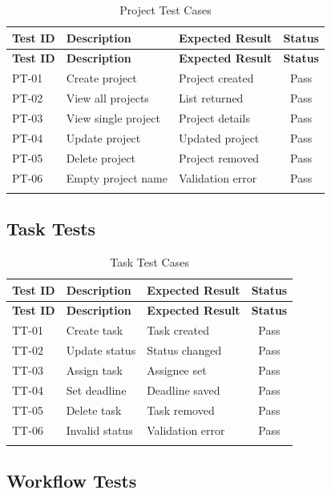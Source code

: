 \documentclass[12pt,a4paper,twoside]{book}
\begin{document}
\begin{longtable}{|l|p{4cm}|p{3cm}|c|}
\hline
\textbf{Test ID} & \textbf{Description} & \textbf{Expected Result} & \textbf{Status} \\ \hline
\endfirsthead
\hline
\textbf{Test ID} & \textbf{Description} & \textbf{Expected Result} & \textbf{Status} \\ \hline
\endhead
PT-01 & Create project & Project created & Pass \\ \hline
PT-02 & View all projects & List returned & Pass \\ \hline
PT-03 & View single project & Project details & Pass \\ \hline
PT-04 & Update project & Updated project & Pass \\ \hline
PT-05 & Delete project & Project removed & Pass \\ \hline
PT-06 & Empty project name & Validation error & Pass \\ \hline
\caption{Project Test Cases}
\end{longtable}

\subsection{Task Tests}

\begin{longtable}{|l|p{4cm}|p{3cm}|c|}
\hline
\textbf{Test ID} & \textbf{Description} & \textbf{Expected Result} & \textbf{Status} \\ \hline
\endfirsthead
\hline
\textbf{Test ID} & \textbf{Description} & \textbf{Expected Result} & \textbf{Status} \\ \hline
\endhead
TT-01 & Create task & Task created & Pass \\ \hline
TT-02 & Update status & Status changed & Pass \\ \hline
TT-03 & Assign task & Assignee set & Pass \\ \hline
TT-04 & Set deadline & Deadline saved & Pass \\ \hline
TT-05 & Delete task & Task removed & Pass \\ \hline
TT-06 & Invalid status & Validation error & Pass \\ \hline
\caption{Task Test Cases}
\end{longtable}

\subsection{Workflow Tests}
\end{document}
